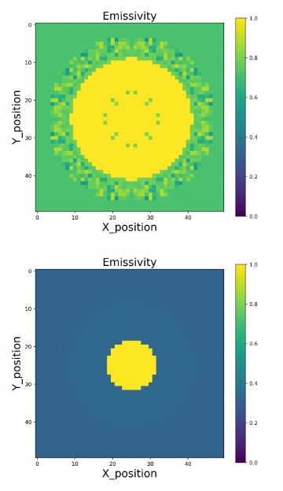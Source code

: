 \begin{figure}[p]
    \centering
    \begin{minipage}{\textwidth}
        \centering
        \begin{subfigure}{0.325\textwidth}
            \centering
            \includegraphics[width=\textwidth]{figures/raw_data/0/mix/emi_cal.jpg}
        \end{subfigure}
        \begin{subfigure}{0.325\textwidth}
            \centering
            \includegraphics[width=\textwidth]{figures/raw_data/5/mix/emi_cal.jpg}

\end{subfigure}
\end{minipage}
\end{figure}
